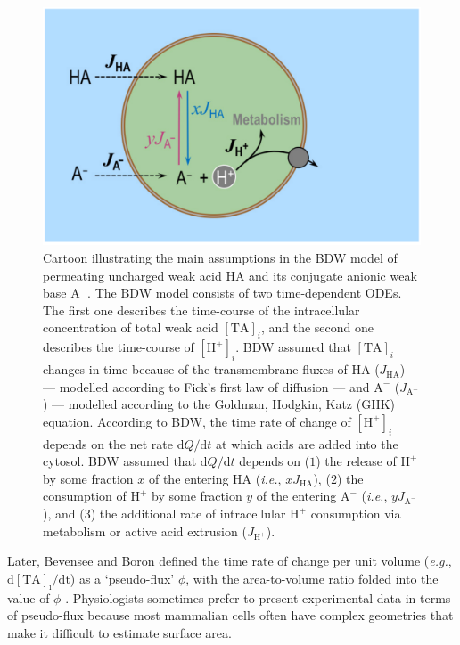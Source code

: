 \documentclass[fleqn,10pt]{physiome}
\begin{document}
\begin{figure}
\centering
\includegraphics[scale=0.2]{Figure 3.png}
\caption{\label{fig:3} Cartoon illustrating the main assumptions in the BDW model of permeating uncharged weak acid $\mathrm{HA}$ and its conjugate anionic weak base $\mathrm{A^-}$. The BDW model consists of two time-dependent ODEs. The first one describes the time-course of the intracellular concentration of total weak acid $\mathrm{[TA]}_i$, and the second one describes the time-course of $\mathrm{[H^+]}_i$. BDW assumed that $\mathrm{[TA]}_i$ changes in time because of the transmembrane fluxes of $\mathrm{HA}$ ($J_\mathrm{HA}$) --- modelled according to Fick's first law of diffusion --- and $\mathrm{A^-}$ ($J_\mathrm{A^-}$) --- modelled according to the Goldman, Hodgkin, Katz (GHK) equation. According to BDW, the time rate of change of $\mathrm{[H^+]}_i$ depends on the net rate $\mathrm{d}Q/\mathrm{d}t$ at which acids are added into the cytosol. BDW assumed that $\mathrm{d}Q/\mathrm{d}t$ depends on ($1$) the release of $\mathrm{H^+}$ by some fraction $x$ of the entering $\mathrm{HA}$ (\emph{i.e.}, $xJ_\mathrm{HA}$), ($2$) the consumption of $\mathrm{H^+}$ by some fraction $y$ of the entering $\mathrm{A^-}$ (\emph{i.e.}, $yJ_\mathrm{A^-}$), and ($3$) the additional rate of intracellular $\mathrm{H^+}$ consumption via metabolism or active acid extrusion ($J_\mathrm{H^+}$).}
\end{figure}


Later, Bevensee and Boron defined the time rate of change per unit volume (\emph{e.g.}, $\mathrm{d[TA]_i/dt}$) as a `pseudo-flux' $\phi$, with the area-to-volume ratio folded into the value of $\phi$ \citep{bevensee2013control}. Physiologists sometimes prefer to present experimental data in terms of pseudo-flux because most mammalian cells often have complex geometries that make it difficult to estimate surface area.\\
\end{document}
